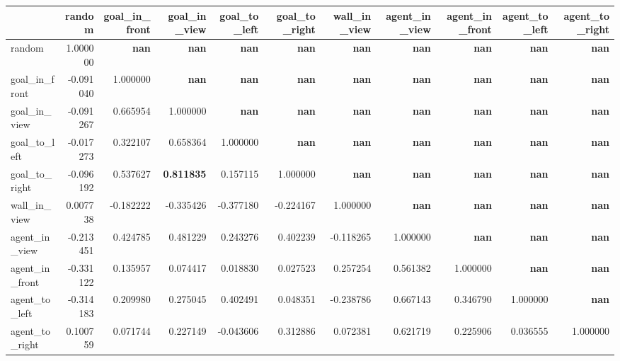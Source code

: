 \begin{tabular}{lrrrrrrrrrr}
\toprule
 & random & goal\_in\_front & goal\_in\_view & goal\_to\_left & goal\_to\_right & wall\_in\_view & agent\_in\_view & agent\_in\_front & agent\_to\_left & agent\_to\_right \\
\midrule
random & 1.000000 & \color{f_white} \bfseries nan & \color{f_white} \bfseries nan & \color{f_white} \bfseries nan & \color{f_white} \bfseries nan & \color{f_white} \bfseries nan & \color{f_white} \bfseries nan & \color{f_white} \bfseries nan & \color{f_white} \bfseries nan & \color{f_white} \bfseries nan \\
goal\_in\_front & -0.091040 & 1.000000 & \color{f_white} \bfseries nan & \color{f_white} \bfseries nan & \color{f_white} \bfseries nan & \color{f_white} \bfseries nan & \color{f_white} \bfseries nan & \color{f_white} \bfseries nan & \color{f_white} \bfseries nan & \color{f_white} \bfseries nan \\
goal\_in\_view & -0.091267 & 0.665954 & 1.000000 & \color{f_white} \bfseries nan & \color{f_white} \bfseries nan & \color{f_white} \bfseries nan & \color{f_white} \bfseries nan & \color{f_white} \bfseries nan & \color{f_white} \bfseries nan & \color{f_white} \bfseries nan \\
goal\_to\_left & -0.017273 & 0.322107 & 0.658364 & 1.000000 & \color{f_white} \bfseries nan & \color{f_white} \bfseries nan & \color{f_white} \bfseries nan & \color{f_white} \bfseries nan & \color{f_white} \bfseries nan & \color{f_white} \bfseries nan \\
goal\_to\_right & -0.096192 & 0.537627 & \color{f_green} \bfseries 0.811835 & 0.157115 & 1.000000 & \color{f_white} \bfseries nan & \color{f_white} \bfseries nan & \color{f_white} \bfseries nan & \color{f_white} \bfseries nan & \color{f_white} \bfseries nan \\
wall\_in\_view & 0.007738 & -0.182222 & -0.335426 & -0.377180 & -0.224167 & 1.000000 & \color{f_white} \bfseries nan & \color{f_white} \bfseries nan & \color{f_white} \bfseries nan & \color{f_white} \bfseries nan \\
agent\_in\_view & -0.213451 & 0.424785 & 0.481229 & 0.243276 & 0.402239 & -0.118265 & 1.000000 & \color{f_white} \bfseries nan & \color{f_white} \bfseries nan & \color{f_white} \bfseries nan \\
agent\_in\_front & -0.331122 & 0.135957 & 0.074417 & 0.018830 & 0.027523 & 0.257254 & 0.561382 & 1.000000 & \color{f_white} \bfseries nan & \color{f_white} \bfseries nan \\
agent\_to\_left & -0.314183 & 0.209980 & 0.275045 & 0.402491 & 0.048351 & -0.238786 & 0.667143 & 0.346790 & 1.000000 & \color{f_white} \bfseries nan \\
agent\_to\_right & 0.100759 & 0.071744 & 0.227149 & -0.043606 & 0.312886 & 0.072381 & 0.621719 & 0.225906 & 0.036555 & 1.000000 \\
\bottomrule
\end{tabular}